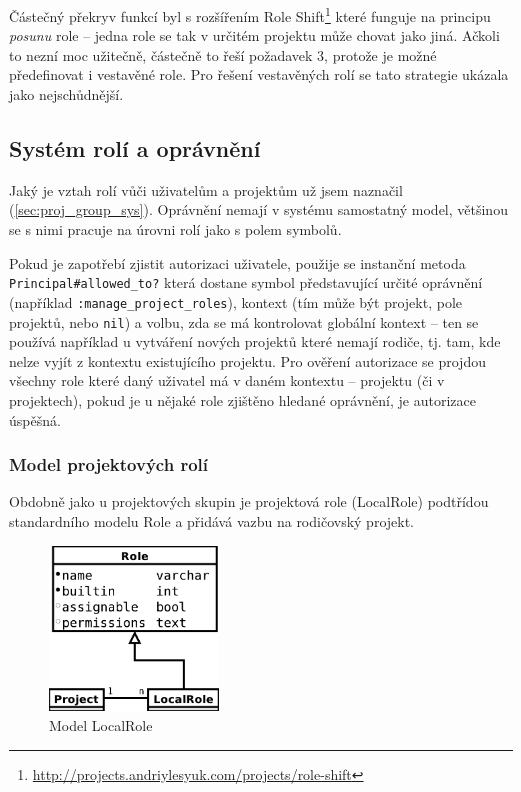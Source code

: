 \documentclass[thesis=B,czech]{FITthesis}[2012/05/02]
\begin{document}
Částečný překryv funkcí byl s rozšířením Role Shift\footnote{\url{http://projects.andriylesyuk.com/projects/role-shift}}
které funguje na principu \emph{posunu} role -- jedna role se tak
v určitém projektu může chovat jako jiná. Ačkoli to nezní moc užitečně,
částečně to řeší požadavek 3, protože je možné předefinovat i vestavěné
role. Pro řešení vestavěných rolí se tato strategie ukázala jako
nejschůdnější.

\subsection{Systém rolí a oprávnění}

Jaký je vztah rolí vůči uživatelům a projektům už jsem naznačil
(\ref{sec:proj_group_sys}). Oprávnění nemají v systému samostatný model,
většinou se s nimi pracuje na úrovni rolí jako s polem symbolů.

Pokud je zapotřebí zjistit autorizaci uživatele, použije se instanční
metoda \lstinline!Principal#allowed_to?! která dostane symbol
představující určité oprávnění (například
\lstinline!:manage_project_roles!), kontext (tím může být projekt, pole
projektů, nebo \lstinline!nil!) a volbu, zda se má kontrolovat globální
kontext -- ten se používá například u vytváření nových projektů které
nemají rodiče, tj. tam, kde nelze vyjít z kontextu existujícího
projektu. Pro ověření autorizace se projdou všechny role které daný
uživatel má v daném kontextu -- projektu (či v projektech), pokud je
u nějaké role zjištěno hledané oprávnění, je autorizace úspěšná.

\subsubsection{Model projektových rolí}

Obdobně jako u projektových skupin je projektová role (LocalRole)
podtřídou standardního modelu Role a přidává vazbu na rodičovský
projekt.

\begin{figure}[htbp]
\centering
\includegraphics[width=0.4\textwidth]{role-er1.pdf}
\caption{Model LocalRole}
\end{figure}
\end{document}
